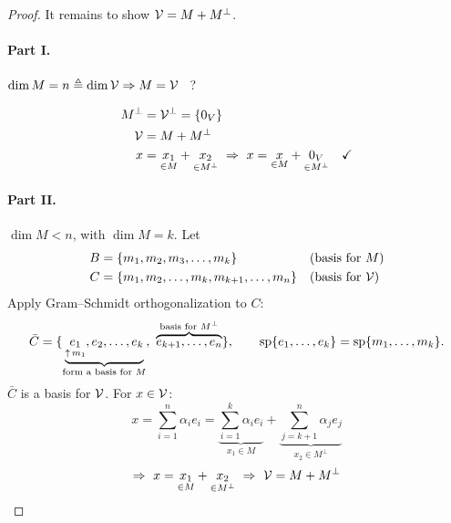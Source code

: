 \begin{proof}
It remains to show $\mathcal{V}=M+M^\perp$.

\paragraph{Part I.} $\dim M=n\triangleq\dim\mathcal{V} \Rightarrow M=\mathcal{V}$ \ \textcircled{?}\par
{}

\begin{center}
\begin{minipage}{0.25\textwidth}\centering
{}
\end{minipage}%
\begin{minipage}{0.6\textwidth}
\begin{align*}
M^\perp&=\mathcal{V}^\perp=\{0_V\}\\
\mathcal{V}&=M+M^\perp\\
x&=\underset{\in M}{x_1}+\underset{\in M^\perp}{x_2}
\ \Rightarrow\ x=\underset{\in M}{x}+\underset{\in M^\perp}{0_V} \quad\checkmark
\end{align*}
\end{minipage}
\end{center}

\paragraph{Part II.} $\dim M<n$, with $\dim M = k$. Let
\begin{align*}
B&=\{m_1,m_2,m_3,\dots,m_k\} && \text{(basis for } M)\\
C&=\{m_1,m_2,\dots,m_k,m_{k+1},\dots,m_n\} && \text{(basis for } \mathcal{V})
\end{align*}
Apply Gram--Schmidt orthogonalization to $C$:
\[
\bar C=\{\underbrace{\underset{\uparrow\, m_1}{e_1},e_2,\dots,e_k}_{\text{form a basis for } M},\ \overbrace{e_{k+1},\dots,e_n}^{\text{basis for } M^\perp}\},
\qquad
\Span\{e_1,\dots,e_k\}=\Span\{m_1,\dots,m_k\}.
\]
$\bar C$ is a basis for $\mathcal{V}$. For $x\in\mathcal{V}$:
\[
x=\sum_{i=1}^{n}\alpha_ie_i=\underbrace{\sum_{i=1}^{k}\alpha_ie_i}_{x_1\in M}+\underbrace{\sum_{j=k+1}^{n}\alpha_je_j}_{x_2\in M^\perp}
\]
\[
\Rightarrow\ x=\underset{\in M}{x_1}+\underset{\in M^\perp}{x_2}\ \Rightarrow\ \mathcal{V}=M+M^\perp \qedhere
\]
\end{proof}
